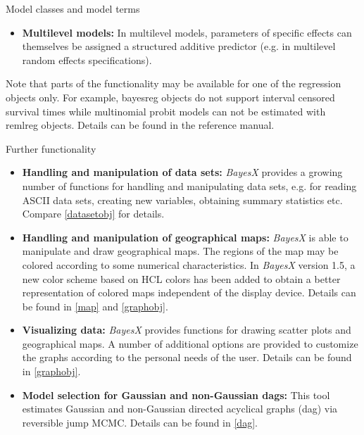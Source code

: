\begin{stanza}{Model classes and model terms}
\begin{itemize}
\item {\bf\sffamily Multilevel models:} In multilevel models, parameters of specific effects can themselves be assigned a structured additive predictor (e.g. in multilevel random effects specifications).
\end{itemize}

Note that parts of the functionality may be available for one of the regression objects only. For example, bayesreg objects do
not support interval censored survival times while multinomial probit models can not be estimated with remlreg objects. Details
can be found in the reference manual.
\end{stanza}

\begin{stanza}{Further functionality}

\begin{itemize}
\item{\bf\sffamily Handling and manipulation of data sets:} {\em
BayesX} provides a growing number of functions for handling and
manipulating data sets, e.g. for reading ASCII data sets, creating
new variables, obtaining summary statistics etc. Compare
\autoref{datasetobj} for details.

\item{\bf\sffamily Handling and manipulation of geographical
maps:} {\em BayesX} is able to manipulate and draw geographical
maps. The regions of the map may be colored according to some
numerical characteristics. In {\em BayesX} version 1.5, a new
color scheme based on HCL colors has been added to obtain a better
representation of colored maps independent of the display device.
Details can be found in \autoref{map} and \autoref{graphobj}.

\item{\bf\sffamily Visualizing data:} {\em BayesX} provides
functions for drawing scatter plots and geographical maps. A
number of additional options are provided to customize the graphs
according to the personal needs of the user. Details can be found
in \autoref{graphobj}.

\item{\bf\sffamily Model selection for Gaussian and non-Gaussian
dags:} This tool estimates Gaussian and non-Gaussian directed
acyclical graphs (dag) via reversible jump MCMC. Details can be
found in \autoref{dag}.
\end{itemize}
\end{stanza}



